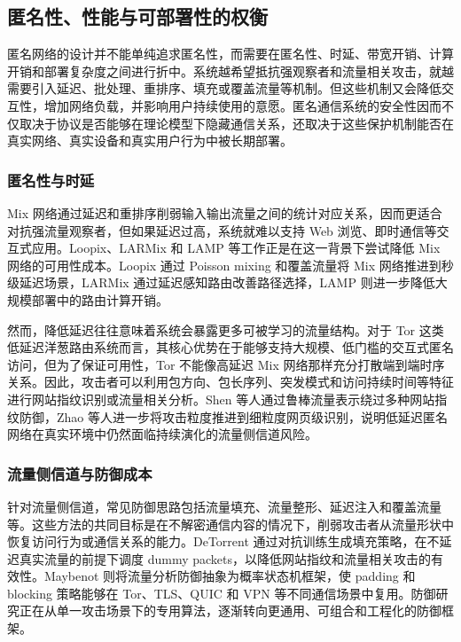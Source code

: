 \subsection{匿名性、性能与可部署性的权衡}

匿名网络的设计并不能单纯追求匿名性，而需要在匿名性、时延、带宽开销、计算开销和部署复杂度之间进行折中。系统越希望抵抗强观察者和流量相关攻击，就越需要引入延迟、批处理、重排序、填充或覆盖流量等机制。但这些机制又会降低交互性，增加网络负载，并影响用户持续使用的意愿。匿名通信系统的安全性因而不仅取决于协议是否能够在理论模型下隐藏通信关系，还取决于这些保护机制能否在真实网络、真实设备和真实用户行为中被长期部署。

\subsubsection{匿名性与时延}

Mix 网络通过延迟和重排序削弱输入输出流量之间的统计对应关系，因而更适合对抗强流量观察者，但如果延迟过高，系统就难以支持 Web 浏览、即时通信等交互式应用。Loopix、LARMix 和 LAMP 等工作正是在这一背景下尝试降低 Mix 网络的可用性成本。Loopix 通过 Poisson mixing 和覆盖流量将 Mix 网络推进到秒级延迟场景\cite{piotrowska2017loopix}，LARMix 通过延迟感知路由改善路径选择\cite{rahimi2024larmix}，LAMP 则进一步降低大规模部署中的路由计算开销\cite{rahimi2025lamp}。

然而，降低延迟往往意味着系统会暴露更多可被学习的流量结构。对于 Tor 这类低延迟洋葱路由系统而言，其核心优势在于能够支持大规模、低门槛的交互式匿名访问，但为了保证可用性，Tor 不能像高延迟 Mix 网络那样充分打散端到端时序关系。因此，攻击者可以利用包方向、包长序列、突发模式和访问持续时间等特征进行网站指纹识别或流量相关分析。Shen 等人通过鲁棒流量表示绕过多种网站指纹防御\cite{shen2023subverting}，Zhao 等人进一步将攻击粒度推进到细粒度网页级识别\cite{zhao2024towards}，说明低延迟匿名网络在真实环境中仍然面临持续演化的流量侧信道风险。

\subsubsection{流量侧信道与防御成本}

针对流量侧信道，常见防御思路包括流量填充、流量整形、延迟注入和覆盖流量等。这些方法的共同目标是在不解密通信内容的情况下，削弱攻击者从流量形状中恢复访问行为或通信关系的能力。DeTorrent 通过对抗训练生成填充策略，在不延迟真实流量的前提下调度 dummy packets，以降低网站指纹和流量相关攻击的有效性\cite{holland2023detorrent}。Maybenot 则将流量分析防御抽象为概率状态机框架，使 padding 和 blocking 策略能够在 Tor、TLS、QUIC 和 VPN 等不同通信场景中复用\cite{pulls2023maybenot}。防御研究正在从单一攻击场景下的专用算法，逐渐转向更通用、可组合和工程化的防御框架。

